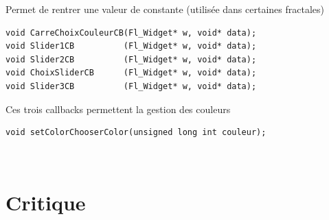\documentclass[a4paper,11pt]{article} \usepackage[T1]{fontenc} \usepackage[utf8]{inputenc} \usepackage[francais]{babel}
\begin{document}
Permet de rentrer une valeur de constante (utilisée dans certaines fractales)

\begin{lstlisting}
void CarreChoixCouleurCB(Fl_Widget* w, void* data);
void Slider1CB          (Fl_Widget* w, void* data);
void Slider2CB          (Fl_Widget* w, void* data);
void ChoixSliderCB		(Fl_Widget* w, void* data);
void Slider3CB          (Fl_Widget* w, void* data);\end{lstlisting}

Ces trois callbacks permettent la gestion des couleurs

\begin{lstlisting}
void setColorChooserColor(unsigned long int couleur);\end{lstlisting}~\\

\section{Critique}
\end{document}
